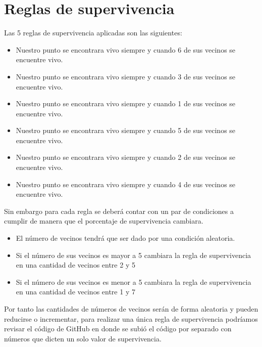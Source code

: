 \documentclass[a4paper]{article}
\begin{document}
\section{Reglas de supervivencia}
\justify Las 5 reglas de supervivencia aplicadas son las siguientes:
\begin{itemize}
    \item Nuestro punto se encontrara vivo siempre y cuando 6 de sus vecinos se encuentre vivo.
    \item Nuestro punto se encontrara vivo siempre y cuando 3 de sus vecinos se encuentre vivo.
    \item Nuestro punto se encontrara vivo siempre y cuando 1 de sus vecinos se encuentre vivo.
    \item Nuestro punto se encontrara vivo siempre y cuando 5 de sus vecinos se encuentre vivo.
    \item Nuestro punto se encontrara vivo siempre y cuando 2 de sus vecinos se encuentre vivo.
    \item Nuestro punto se encontrara vivo siempre y cuando 4 de sus vecinos se encuentre vivo.
\end{itemize}
\justify Sin embargo para cada regla se deberá contar con un par de condiciones a cumplir de manera que el porcentaje de supervivencia cambiara.
\begin{itemize}
\item El número de vecinos tendrá que ser dado por una condición aleatoria.
\item Si el número de sus vecinos es mayor a 5 cambiara la regla de supervivencia en una cantidad de vecinos entre 2 y 5
\item Si el número de sus vecinos es menor a 5 cambiara la regla de supervivencia en una cantidad de vecinos entre 1 y 7
\end{itemize}
\justify Por tanto las cantidades de números de vecinos serán de forma aleatoria y pueden reducirse o incrementar, para realizar una única regla de supervivencia podríamos revisar el código de GitHub \cite{git1sec} en donde se subió el código por separado con números que dicten un solo valor de supervivencia.
\end{document}
